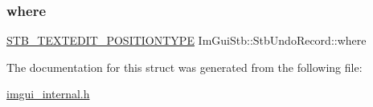 \mbox{\label{struct_im_gui_stb_1_1_stb_undo_record_acd3cbeaa50d642520c1a317c7d89a47b}} 
\subsubsection{\texorpdfstring{where}{where}}
{\footnotesize\ttfamily \mbox{\hyperlink{imstb__textedit_8h_a5d0c1b8751b6517e3d817f2a025ed654}{S\+T\+B\+\_\+\+T\+E\+X\+T\+E\+D\+I\+T\+\_\+\+P\+O\+S\+I\+T\+I\+O\+N\+T\+Y\+PE}} Im\+Gui\+Stb\+::\+Stb\+Undo\+Record\+::where}



The documentation for this struct was generated from the following file\+:\begin{DoxyCompactItemize}
\item 
\mbox{\hyperlink{imgui__internal_8h}{imgui\+\_\+internal.\+h}}\end{DoxyCompactItemize}

